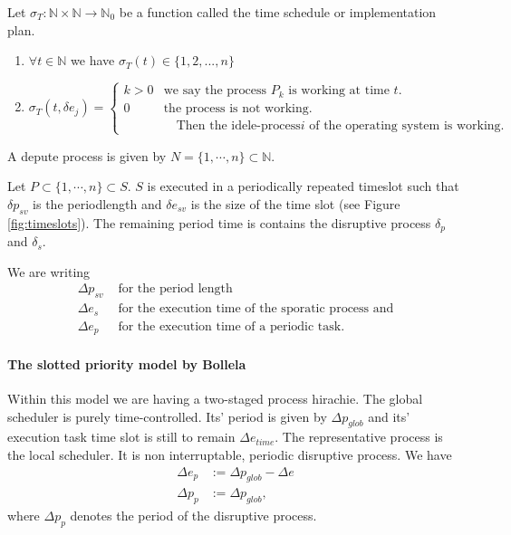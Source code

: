 	\begin{definition}
	Let $\sigma_T: \mathbb{N} \times \mathbb{N} \rightarrow \mathbb{N}_0$ be a function called the time schedule or implementation plan.
	\begin{enumerate}
	\item $\forall t \in \mathbb{N}$ we have $\sigma_T(t)\in \{1,2,...,n\}$
	\item \begin{equation}
			\sigma_T(t,\delta e_j) =
			\begin{cases}
				k > 0 & \text{we say the process $P_k$ is working at time $t$.}\\
				0 & \text{the process is not working.}\\
				  &\quad  \text{Then the idele-process$i$ of the operating system is working.}
			\end{cases}       
	\end{equation}
	\end{enumerate}
	\end{definition}
	
	A depute process is given by $ N = \{1, \cdots, n\}\subset \mathbb{N}$. 
	
	Let $P \subset \{1, \cdots, n\} \subset S$.
	$S$ is executed in a periodically repeated timeslot such that $\delta p_{sv}$ is the periodlength and $\delta e_{sv}$ is the size of the time slot (see Figure \ref{fig:timeslots}).
	The remaining period time is contains the  disruptive process $\delta_p$ and $\delta_s$.
	
	We are writing
	\begin{align}
		\Delta p_{sv} &\text{ for the period length} \\
		\Delta e_s &\text{ for the execution time of the sporatic process and}\\ 
		\Delta e_p &\text{ for the execution time of a periodic task.}
	\end{align}
	
	\paragraph{The slotted priority model by Bollela}
	
	Within this model we are having a two-staged process hirachie. 
	The global scheduler is purely time-controlled.
	Its' period is given by $\Delta p_{glob}$ and its' execution task time slot is still to remain $\Delta e_{time}$.
	The representative process is the local scheduler. 
	It is non interruptable, periodic disruptive process.
	We have
	\begin{align}
	\Delta e_p &:= \Delta p_{glob} - \Delta e\\
	\Delta p_{p} &:= \Delta p_{glob}, 
	\end{align}
	where $\Delta p_{p}$ denotes the period of the disruptive process.
	
